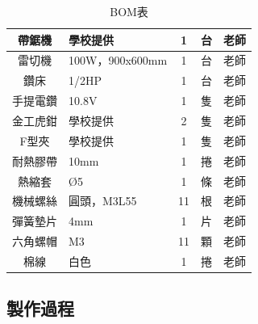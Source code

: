 \documentclass[12pt,a4paper]{article}
\begin{document}
\begin{CJK*}{UTF8}{bkai}
\begin{table}[H]
\begin{center}
{\begin{tabularx}{\textwidth}{|c|Y|c|c|c|}
                    \hline
                    帶鋸機      & 學校提供                     & 1  & 台  & 老師 \\
                    \hline
                    雷切機      & 100W，900x600mm           & 1  & 台  & 老師 \\
                    \hline
                    鑽床       & 1/2HP                    & 1  & 台  & 老師 \\
                    \hline
                    手提電鑽     & 10.8V                    & 1  & 隻  & 老師 \\
                    \hline
                    金工虎鉗     & 學校提供                     & 2  & 隻  & 老師 \\
                    \hline
                    F型夾      & 學校提供                     & 1  & 隻  & 老師 \\
                    \hline
                    耐熱膠帶     & 10mm                     & 1  & 捲  & 老師 \\
                    \hline
                    熱縮套      & Ø5                       & 1  & 條  & 老師 \\
                    \hline
                    機械螺絲     & 圓頭，M3L55                 & 11 & 根  & 老師 \\
                    \hline
                    彈簧墊片     & 4mm                      & 1  & 片  & 老師 \\
                    \hline
                    六角螺帽     & M3                       & 11 & 顆  & 老師 \\
                    \hline
                    棉線       & 白色                       & 1  & 捲  & 老師 \\
                    \hline
                \end{tabularx}}
            \caption{BOM表}
        \end{center}
    \end{table}
    \renewcommand{\arraystretch}{1}
    \newpage
    \subsection{製作過程}

\end{CJK*}
\end{document}
